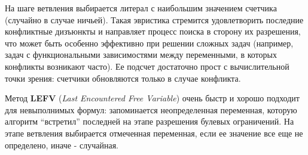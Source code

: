 На шаге ветвления выбирается литерал с наибольшим значением счетчика (случайно в случае ничьей). Такая эвристика стремится удовлетворить последние конфликтные дизъюнкты и направляет процесс поиска в сторону их разрешения, что может быть особенно эффективно при решении сложных задач (например, задач с функциональными зависимостями между переменными, в которых конфликты возникают часто). Ее подсчет достаточно прост с вычислительной точки зрения: счетчики обновляются только в случае конфликта.

Метод \textbf{LEFV} (\textit{Last Encountered Free Variable}) очень быстр и хорошо подходит для невыполнимых формул: запоминается неопределенная переменная, которую алгоритм \enquote{встретил} последней на этапе разрешения булевых ограничений. На этапе ветвления выбирается отмеченная переменная, если ее значение все еще не определено, иначе - случайная.

